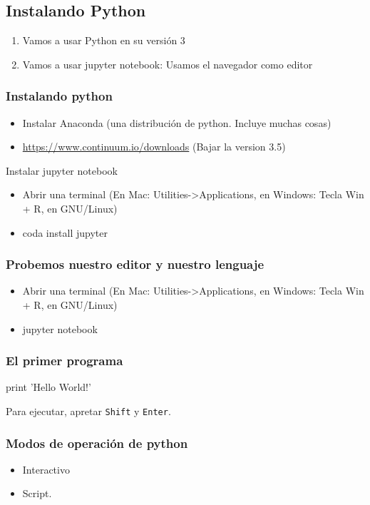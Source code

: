 \subsection{Instalando Python}

\begin{frame}
    \begin{enumerate}
        \item Vamos a usar Python  en su versi\'on 3
        \item Vamos a usar jupyter notebook: Usamos el navegador como editor
    \end{enumerate}
\end{frame}

\begin{frame}
    \frametitle{Instalando python}
    \begin{itemize}
        \item Instalar Anaconda (una distribuci\'on de python. Incluye muchas cosas) 
        \item \url{https://www.continuum.io/downloads} (Bajar la version 3.5)
    \end{itemize}
    Instalar jupyter notebook
    \begin{itemize}
        \item Abrir una terminal (En Mac: Utilities->Applications, en Windows: Tecla Win + R, en GNU/Linux)
        \item coda install jupyter
    \end{itemize}
\end{frame}


\begin{frame}
    \frametitle{Probemos nuestro editor y nuestro lenguaje}
    \begin{itemize}
        \item Abrir una terminal (En Mac: Utilities->Applications, en Windows: Tecla Win + R, en GNU/Linux)
        \item jupyter notebook
    \end{itemize}
\end{frame}


\begin{frame}[fragile]
\frametitle{El primer programa}
\begin{python}
    print 'Hello World!'
\end{python}
Para ejecutar, apretar \texttt{Shift} y \texttt{Enter}.
\end{frame}


\begin{frame}
    \frametitle{Modos de operaci\'on de python}
    \begin{itemize}
        \item Interactivo \pause
        \item Script.
    \end{itemize}
\end{frame}

